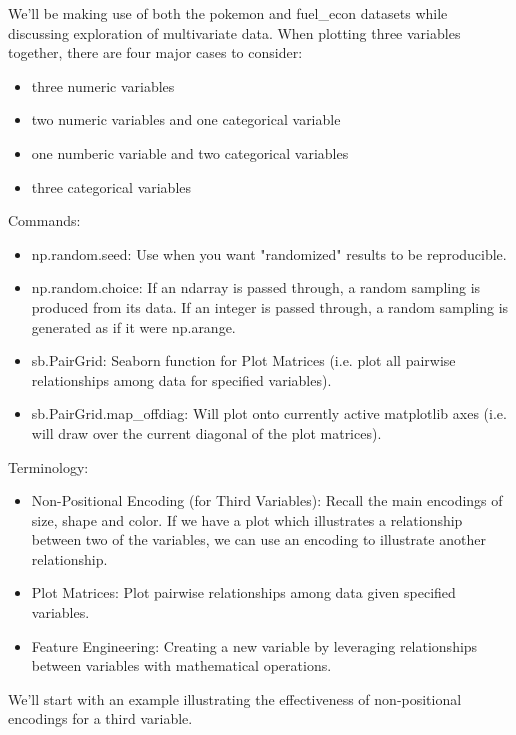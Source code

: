 We'll be making use of both the pokemon and fuel\_econ datasets while discussing exploration of multivariate data. When plotting three variables together, there are four major cases to consider:
\begin{itemize}
	\item three numeric variables
	\item two numeric variables and one categorical variable
	\item one numberic variable and two categorical variables
	\item three categorical variables
\end{itemize}

Commands:
\begin{itemize}
	\item np.random.seed: Use when you want "randomized" results to be reproducible.
	\item np.random.choice: If an ndarray is passed through, a random sampling is produced from its data. If an integer is passed through, a random sampling is generated as if it were np.arange.
	\item sb.PairGrid: Seaborn function for Plot Matrices (i.e. plot all pairwise relationships among data for specified variables).
	\item sb.PairGrid.map\_offdiag: Will plot onto currently active matplotlib axes (i.e. will draw over the current diagonal of the plot matrices).
\end{itemize}

Terminology:
\begin{itemize}
	\item Non-Positional Encoding (for Third Variables): Recall the main encodings of size, shape and color. If we have a plot which illustrates a relationship between two of the variables, we can use an encoding to illustrate another relationship.
	\item Plot Matrices: Plot pairwise relationships among data given specified variables.
	\item Feature Engineering: Creating a new variable by leveraging relationships between variables with mathematical operations.
\end{itemize}

We'll start with an example illustrating the effectiveness of non-positional encodings for a third variable.
\\\\

